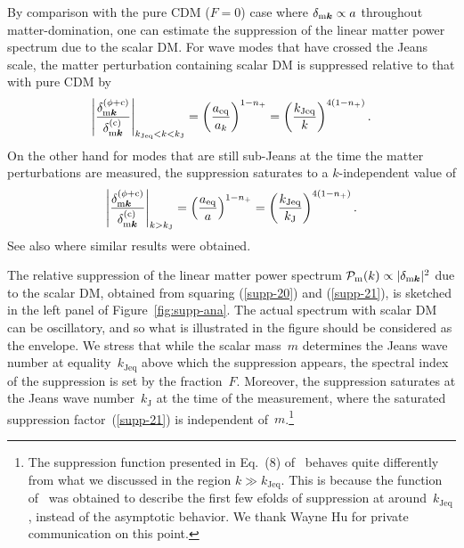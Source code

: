 \documentclass[11pt,nofootinbib]{article}
\numberwithin{equation}{section}
\begin{document}
By comparison with the pure CDM ($F = 0$) case where
$\delta_{\mathrm{m}\boldsymbol{k}} \propto a$ throughout 
matter-domination, one can estimate the suppression of the linear matter
power spectrum due to the scalar DM. 
For wave modes that have crossed the Jeans scale, the matter perturbation
containing scalar DM is suppressed relative to that with pure CDM by
\begin{equation}
 \left|
  \frac{\delta_{\mathrm{m}\boldsymbol{k}}^{(\phi + \mathrm{c})}}
  {\delta_{\mathrm{m}\boldsymbol{k}}^{(\mathrm{c})}}
  \right|_{k_{\mathrm{Jeq}} < k < k_{\mathrm{J}}}
=
 \left(\frac{a_{\mathrm{eq}}}{a_k}\right)^{1-n_+} =
 \left(\frac{k_{\mathrm{Jeq}}}{k}\right)^{4 (1-n_+)}.
\label{supp-20}
\end{equation}
On the other hand for modes that are still sub-Jeans at the time the
matter perturbations are measured, the suppression saturates to a 
$k$-independent value of
\begin{equation}
 \left|
  \frac{\delta_{\mathrm{m}\boldsymbol{k}}^{(\phi + \mathrm{c})}}
  {\delta_{\mathrm{m}\boldsymbol{k}}^{(\mathrm{c})}}
  \right|_{k > k_{\mathrm{J}}}
 =
 \left(\frac{a_{\mathrm{eq}}}{a}\right)^{1-n_+} =
 \left(\frac{k_{\mathrm{Jeq}}}{k_{\mathrm{J}} } \right)^{4 (1-n_+)}.
 \label{supp-21}
\end{equation}
See also \cite{Arvanitaki:2009fg} where similar results were obtained.

The relative suppression of the linear matter power spectrum
$\mathcal{P}_{\mathrm{m}} (k) \propto \lvert\delta_{\mathrm{m} \boldsymbol{k}}\rvert^2$
due to the scalar DM, obtained from squaring (\ref{supp-20}) and (\ref{supp-21}), 
is sketched in the left panel of Figure~\ref{fig:supp-ana}.
The actual spectrum with scalar DM can be oscillatory, and so what is
illustrated in the figure should be considered as the envelope.
We stress that while the scalar mass~$m$ determines the
Jeans wave number at equality~$k_{\mathrm{Jeq}}$ above which the 
suppression appears, the spectral index of the suppression is set by the
fraction~$F$.
Moreover, the suppression saturates at the Jeans wave
number~$k_{\mathrm{J}}$ at the time of the measurement,
where the saturated suppression factor~(\ref{supp-21}) is independent
of~$m$.\footnote{The suppression function presented in Eq.~(8)
of~\cite{Hu:2000ke} behaves quite differently from what we 
discussed in the region $ k \gg k_{\mathrm{Jeq}}$. 
This is because the function of~\cite{Hu:2000ke} was obtained to
describe the first few efolds of suppression at around~$k_{\mathrm{Jeq}}$, instead of
the asymptotic behavior.
We thank Wayne Hu for private communication on this point.}
\end{document}
